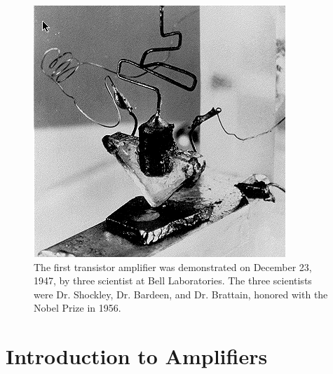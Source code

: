 \begin{figure}[tb]
\centering
\includegraphics[width=.5\columnwidth]{bjt_invent.png}
\caption{The first transistor amplifier was demonstrated on December 23, 1947, by three scientist at Bell Laboratories.  The three scientists were Dr. Shockley, Dr. Bardeen, and Dr. Brattain, honored with the Nobel Prize in 1956.}
\label{fig:bjt_invent}
\end{figure}
\section{Introduction to Amplifiers}
